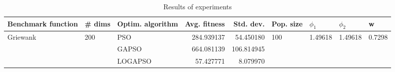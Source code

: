 \begin{table}
\centering
\caption{Results of experiments}
\begin{tabular}{lllrrllll}
\toprule
       Benchmark function &              \# dims & Optim. algorithm &  Avg. fitness &  Std. dev. &            Pop. size &               $\phi_{1}$ &               $\phi_{2}$ &                       w \\
\midrule
\multirow{3}{*}{Griewank} & \multirow{3}{*}{200} &              PSO &    284.939137 &  54.450180 & \multirow{3}{*}{100} & \multirow{3}{*}{1.49618} & \multirow{3}{*}{1.49618} & \multirow{3}{*}{0.7298} \\
                          &                      &            GAPSO &    664.081139 & 106.814945 &                      &                          &                          &                         \\
                          &                      &          LOGAPSO &     57.427771 &   8.079970 &                      &                          &                          &                         \\
\bottomrule
\end{tabular}
\end{table}
